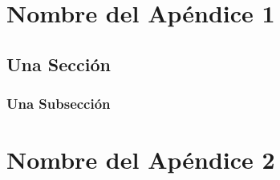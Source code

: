 \documentclass[12pt,a4paper,oneside]{book}
\begin{document}




\appendix %


\chapter{Nombre del Apéndice 1} 
\lipsum[1]
\section{Una Sección}
\lipsum[2-3]
\subsection{Una Subsección}
\lipsum[4-6]

\chapter{Nombre del Apéndice 2} 
\lipsum[6-9]

\end{document}

